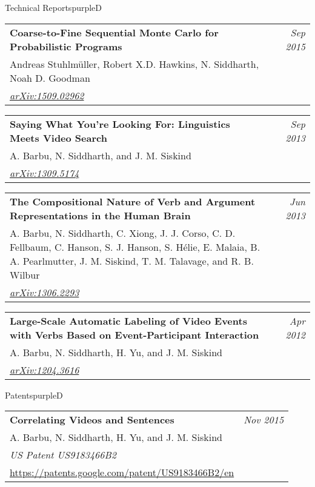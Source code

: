 \documentclass[a4paper]{article}
\makeatletter
\newlength{\itemtextwidth}
\newenvironment{publication}[5]
{ \item
  \begin{tabular*}{\itemtextwidth}{@{}p{5.6in}@{\extracolsep{\fill}}r@{}}
    \textbf{#1} & \textit{#2}\\ #3 &\\ \textit{#4}&\\ #5
  \end{tabular*}
  \vspace*{-2pt}
} {}
\def\item{\addtocounter{enumi}{-2}\oldItem}
\makeatother
\begin{document}
\begin{region}[T][4]{Technical Reports}{purpleD}
  \begin{publication} {Coarse-to-Fine Sequential Monte Carlo for Probabilistic Programs}
    {Sep 2015}
    {Andreas Stuhlmüller, Robert X.D. Hawkins, N. Siddharth, Noah D. Goodman}
    {\href{http://arxiv.org/abs/1509.02962}{arXiv:1509.02962}}
    {}
  \end{publication}
  \begin{publication} {Saying What You're Looking For: Linguistics Meets Video Search}
    {Sep 2013}
    {A. Barbu, N. Siddharth, and J. M. Siskind}
    {\href{http://arxiv.org/abs/1309.5174}{arXiv:1309.5174}}
    {}
  \end{publication}
  \begin{publication} {The Compositional Nature of Verb and Argument
      Representations in the Human Brain}
    {Jun 2013}
    {A. Barbu, N. Siddharth, C. Xiong, J. J. Corso, C. D. Fellbaum, C. Hanson, S. J. Hanson, S.
      H\'elie, E. Malaia, B. A. Pearlmutter, J. M. Siskind, T. M. Talavage, and R. B. Wilbur}
    {\href{http://arxiv.org/abs/1306.2293}{arXiv:1306.2293}}
    {}
  \end{publication}
  \begin{publication} {Large-Scale Automatic Labeling of Video Events with
      Verbs Based on Event-Participant Interaction}
    {Apr 2012}
    {A. Barbu, N. Siddharth, H. Yu, and J. M. Siskind}
    {\href{http://arxiv.org/abs/1204.3616}{arXiv:1204.3616}}
    {}
  \end{publication}
\end{region}

\begin{region}[P][1]{Patents}{purpleD}
  \begin{publication} {Correlating Videos and Sentences}
    {Nov 2015}                  %
    {A. Barbu, N. Siddharth, H. Yu, and J. M. Siskind}
    {US Patent US9183466B2}
    {\url{https://patents.google.com/patent/US9183466B2/en}}
  \end{publication}
\end{region}
\end{document}
